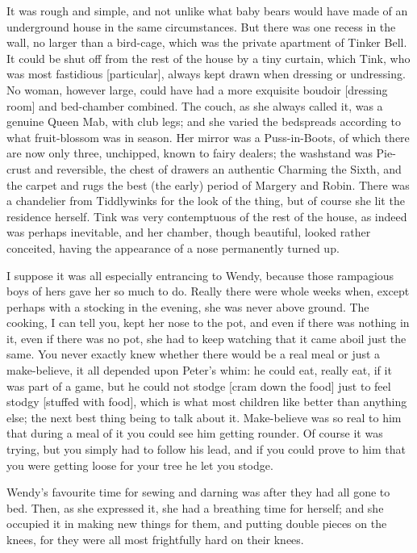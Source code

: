 It was rough and simple, and not unlike what baby bears would have made of
an underground house in the same circumstances. But there was one recess
in the wall, no larger than a bird-cage, which was the private apartment
of Tinker Bell. It could be shut off from the rest of the house by a tiny
curtain, which Tink, who was most fastidious [particular], always kept
drawn when dressing or undressing. No woman, however large, could have had
a more exquisite boudoir [dressing room] and bed-chamber combined. The
couch, as she always called it, was a genuine Queen Mab, with club legs;
and she varied the bedspreads according to what fruit-blossom was in
season. Her mirror was a Puss-in-Boots, of which there are now only three,
unchipped, known to fairy dealers; the washstand was Pie-crust and
reversible, the chest of drawers an authentic Charming the Sixth, and the
carpet and rugs the best (the early) period of Margery and Robin. There
was a chandelier from Tiddlywinks for the look of the thing, but of course
she lit the residence herself. Tink was very contemptuous of the rest of
the house, as indeed was perhaps inevitable, and her chamber, though
beautiful, looked rather conceited, having the appearance of a nose
permanently turned up.


I suppose it was all especially entrancing to Wendy, because those
rampagious boys of hers gave her so much to do. Really there were whole
weeks when, except perhaps with a stocking in the evening, she was never
above ground. The cooking, I can tell you, kept her nose to the pot, and
even if there was nothing in it, even if there was no pot, she had to keep
watching that it came aboil just the same. You never exactly knew whether
there would be a real meal or just a make-believe, it all depended upon
Peter's whim: he could eat, really eat, if it was part of a game, but he
could not stodge [cram down the food] just to feel stodgy [stuffed with
food], which is what most children like better than anything else; the
next best thing being to talk about it. Make-believe was so real to him
that during a meal of it you could see him getting rounder. Of course it
was trying, but you simply had to follow his lead, and if you could prove
to him that you were getting loose for your tree he let you stodge.


Wendy's favourite time for sewing and darning was after they had all gone
to bed. Then, as she expressed it, she had a breathing time for herself;
and she occupied it in making new things for them, and putting double
pieces on the knees, for they were all most frightfully hard on their
knees.


